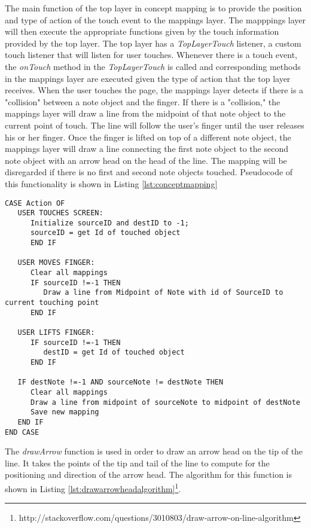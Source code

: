 The main function of the top layer in concept mapping is to provide the position and type of action of the touch event to the mappings layer. The mapppings layer will then execute the appropriate functions given by the touch information provided by the top layer. The top layer has a \textit{TopLayerTouch} listener, a custom touch listener that will listen for user touches. Whenever there is a touch event, the \textit{onTouch} method in the \textit{TopLayerTouch} is called and corresponding methods in the mappings layer are executed given the type of action that the top layer receives. When the user touches the page, the mappings layer detects if there is a "collision" between a note object and the finger. If there is a "collision," the mappings layer will draw a line from the midpoint of that note object to the current point of touch. The line will follow the user's finger until the user releases his or her finger. Once the finger is lifted on top of a different note object, the mappings layer will draw a line connecting the first note object to the second note object with an arrow head on the head of the line. The mapping will be disregarded if there is no first and second note objects touched. Pseudocode of this functionality is shown in Listing \ref{lst:conceptmapping}

\begin{lstlisting}[frame=single, label=lst:conceptmapping, caption=Pseudocode for Concept Mapping]
CASE Action OF
   USER TOUCHES SCREEN:
      Initialize sourceID and destID to -1;
      sourceID = get Id of touched object
	  END IF
   
   USER MOVES FINGER:
      Clear all mappings
      IF sourceID !=-1 THEN
	     Draw a line from Midpoint of Note with id of SourceID to current touching point
  	  END IF
   
   USER LIFTS FINGER:
      IF sourceID !=-1 THEN
         destID = get Id of touched object
      END IF

   IF destNote !=-1 AND sourceNote != destNote THEN
      Clear all mappings
	  Draw a line from midpoint of sourceNote to midpoint of destNote
	  Save new mapping
   END IF
END CASE
\end{lstlisting}

The \textit{drawArrow} function is used in order to draw an arrow head on the tip of the line. It takes the points of the tip and tail of the line to compute for the positioning and direction of the arrow head. The algorithm for this function is shown in Listing \ref{lst:drawarrowheadalgorithm}\footnote[7]{http://stackoverflow.com/questions/3010803/draw-arrow-on-line-algorithm}.

